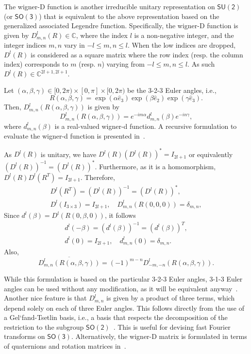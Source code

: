 \documentclass[onecolumn,11pt]{IEEEtran}
\newcommand{\SO}{\ensuremath{\mathsf{SO(3)}}}
\newcommand{\Cp}{\ensuremath{\mathbb{C}}}
\begin{document}
The wigner-D function is another irreducible unitary representation on $\mathsf{SU(2)}$ (or $\SO$) that is equivalent to the above representation based on the generalized associated Legendre function. 
Specifically, the wigner-D function is given by $D^l_{m,n}(R)\in\Cp$, where the index $l$ is a non-negative integer, and the integer indices $m,n$ vary in $-l\leq m,n \leq l$. 
When the low indices are dropped, $D^l(R)$ is considered as a square matrix where the row index (resp. the column index) corresponds to $m$ (resp. $n$) varying from $-l\leq m,n \leq l$. 
As such $D^l(R)\in\Cp^{2l+1,2l+1}$.

Let $(\alpha,\beta,\gamma)\in[0,2\pi)\times[0,\pi]\times[0,2\pi)$ be the 3-2-3 Euler angles, i.e., 
\[
R(\alpha,\beta,\gamma)=\exp(\alpha\hat e_3)\exp(\beta\hat e_2)\exp(\gamma\hat e_3). 
\]
Then, $D^l_{m,n}(R(\alpha,\beta,\gamma))$ is given by
\begin{equation}\label{eqn:Dlmn}
D^l_{m,n}(R(\alpha,\beta,\gamma)) = e^{-i m\alpha} d^l_{m,n}(\beta) e^{-i n\gamma},
\end{equation}
where $d^l_{m,n}(\beta)$ is a real-valued wigner-d function. 
A recursive formulation to evaluate the wigner-d function is presented in~\cite{BlaFloJMS97}. 

As $D^l(R)$ is unitary, we have $D^l(R)(D^{l}(R))^*=I_{2l+1}$ or equivalently $(D^l(R))^{-1}=(D^l(R))^*$. 
Furthermore, as it is a homomorphism, $D^l(R)D^l(R^T)=I_{2l+1}$. 
Therefore,
\begin{gather*}
D^l(R^T) = (D^l(R))^{-1} = (D^l(R))^*,\\
D^l(I_{3\times 3}) =I_{2l+1},\quad
D^l_{m,n}(R(0,0,0))=\delta_{m,n},
\end{gather*}
Since $d^l(\beta)=D^l(R(0,\beta,0))$, it follows
\begin{gather*}
d^l(-\beta) = (d^l(\beta))^{-1} = (d^l(\beta))^T,\\
d^l(0)=I_{2l+1},\quad d^l_{m,n}(0)=\delta_{m,n}.
\end{gather*}
Also,
\begin{equation}\label{eqn:Dlmn_bar}
\overline{D^l_{m,n}(R(\alpha,\beta,\gamma))}=(-1)^{m-n} D^l_{-m,-n}(R(\alpha,\beta,\gamma)).
\end{equation}

While this formulation is based on the particular 3-2-3 Euler angles, 3-1-3 Euler angles can be used without any modification, as it will be equivalent anyway~\cite{ChiKya01}. 
Another nice feature is that $D^l_{m,n}$ is given by a product of three terms, which depend solely on each of three Euler angles. 
This follows directly from the use of a Gel`fand-Tsetlin basis, i.e., a basis that respects the decomposition of the restriction to the subgroup $\mathsf{SO(2)}$~\cite{MasRocGC97}. 
This is useful for devising fast Fourier transforms on $\SO$. 
Alternatively, the wigner-D matrix is formulated in terms of quaternions and rotation matrices in~\cite{LynStoMS89}.
\end{document}
